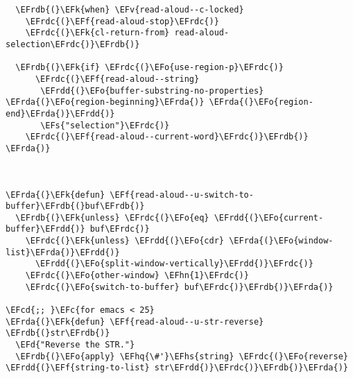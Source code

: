\documentclass[a4wide,10pt]{article}
\newcommand{\EFc}[1]{\textcolor{EFc}{#1}} %
\newcommand{\EFcd}[1]{\textcolor{EFcd}{#1}} %
\newcommand{\EFs}[1]{\textcolor{EFs}{#1}} %
\newcommand{\EFd}[1]{\textcolor{EFd}{#1}} %
\newcommand{\EFk}[1]{\textcolor{EFk}{#1}} %
\newcommand{\EFf}[1]{\textcolor{EFf}{#1}} %
\newcommand{\EFv}[1]{\textcolor{EFv}{#1}} %
\newcommand{\EFo}[1]{\textcolor{EFo}{#1}} %
\newcommand{\EFhn}[1]{\textcolor{EFhn}{\textbf{#1}}} %
\newcommand{\EFhq}[1]{\textcolor{EFhq}{#1}} %
\newcommand{\EFhs}[1]{\textcolor{EFhs}{#1}} %
\newcommand{\EFrda}[1]{\textcolor{EFrda}{#1}} %
\newcommand{\EFrdb}[1]{\textcolor{EFrdb}{#1}} %
\newcommand{\EFrdc}[1]{\textcolor{EFrdc}{#1}} %
\newcommand{\EFrdd}[1]{\textcolor{EFrdd}{#1}} %
\begin{document}
\begin{Code}
\begin{Verbatim}
  \EFrdb{(}\EFk{when} \EFv{read-aloud--c-locked}
    \EFrdc{(}\EFf{read-aloud-stop}\EFrdc{)}
    \EFrdc{(}\EFk{cl-return-from} read-aloud-selection\EFrdc{)}\EFrdb{)}

  \EFrdb{(}\EFk{if} \EFrdc{(}\EFo{use-region-p}\EFrdc{)}
      \EFrdc{(}\EFf{read-aloud--string}
       \EFrdd{(}\EFo{buffer-substring-no-properties} \EFrda{(}\EFo{region-beginning}\EFrda{)} \EFrda{(}\EFo{region-end}\EFrda{)}\EFrdd{)}
       \EFs{"selection"}\EFrdc{)}
    \EFrdc{(}\EFf{read-aloud--current-word}\EFrdc{)}\EFrdb{)} \EFrda{)}



\EFrda{(}\EFk{defun} \EFf{read-aloud--u-switch-to-buffer}\EFrdb{(}buf\EFrdb{)}
  \EFrdb{(}\EFk{unless} \EFrdc{(}\EFo{eq} \EFrdd{(}\EFo{current-buffer}\EFrdd{)} buf\EFrdc{)}
    \EFrdc{(}\EFk{unless} \EFrdd{(}\EFo{cdr} \EFrda{(}\EFo{window-list}\EFrda{)}\EFrdd{)}
      \EFrdd{(}\EFo{split-window-vertically}\EFrdd{)}\EFrdc{)}
    \EFrdc{(}\EFo{other-window} \EFhn{1}\EFrdc{)}
    \EFrdc{(}\EFo{switch-to-buffer} buf\EFrdc{)}\EFrdb{)}\EFrda{)}

\EFcd{;; }\EFc{for emacs < 25}
\EFrda{(}\EFk{defun} \EFf{read-aloud--u-str-reverse} \EFrdb{(}str\EFrdb{)}
  \EFd{"Reverse the STR."}
  \EFrdb{(}\EFo{apply} \EFhq{\#'}\EFhs{string} \EFrdc{(}\EFo{reverse} \EFrdd{(}\EFf{string-to-list} str\EFrdd{)}\EFrdc{)}\EFrdb{)}\EFrda{)}


\end{Verbatim}
\end{Code}
\end{document}
